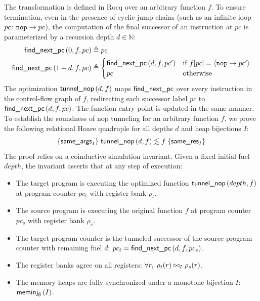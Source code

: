 \documentclass[report.tex]{subfiles}
\begin{document}
The transformation is defined in Rocq over an arbitrary \muRTL{} function $f$.
To ensure termination,
even in the presence of cyclic jump chains
(such as an infinite loop $pc \colon \Inop{pc}$),
the computation of the final successor of an instruction at $pc$
is parameterized by a recursion depth $d \in \mathbb{N}$:
\begin{equation*}
  \begin{aligned}
    \findnextpc{0}{f}{pc}
    & \triangleq pc \\
    \findnextpc{1 + d}{f}{pc}
    & \triangleq
      \begin{cases}
        \findnextpc{d}{f}{pc'}
        & \text{if } \pcatis{f}{pc}{\Inop{pc'}}
        \\
        pc
        & \text{otherwise}
      \end{cases}
  \end{aligned}
\end{equation*}
The optimization $\tunnelnop{d}{f}$ maps $\findnextpcf$
over every instruction in the control-flow graph of $f$,
redirecting each successor label $pc$ to
$\findnextpc{d}{f}{pc}$.
The function entry point is updated in the same manner.
To establish the soundness of nop tunneling for an arbitrary function $f$,
we prove the following relational Hoare quadruple for all depths $d$
and heap bijections $I$:
\begin{equation}
  \label{eq:nop-hoare}
  \hoareq{\sameargsf{I}}{\tunnelnop{d}{f}}{f}{\samerf{I}}
\end{equation}
The proof relies on a coinductive simulation invariant.
Given a fixed initial fuel $depth$,
the invariant asserts that at any step of execution:
\begin{itemize}
  \item The target program is executing the optimized function
        $\tunnelnop{depth}{f}$ at program counter $pc_t$
        with register bank $\rho_t$.
  \item The source program is executing the original function $f$
        at program counter $pc_s$ with register bank $\rho_s$.
  \item The target program counter is the tunneled successor of the source
        program counter with remaining fuel $d$:
        $pc_t = \findnextpc{d}{f}{pc_s}$.
  \item The register banks agree on all registers:
        $\forall r,\; \sameval{I}{\rho_t(r)}{\rho_s(r)}$.
  \item The memory heaps are fully synchronized under a monotone bijection $I$:
        $\meminj{I}{\emptyset}$.
\end{itemize}
\end{document}
